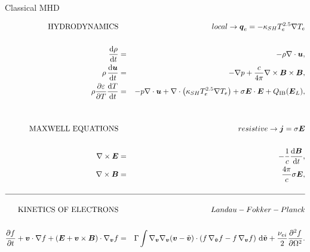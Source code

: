 \documentclass[8pt, compress]{beamer}
\newcommand{\pdv}[2]{\frac{\partial{#1}}{\partial{#2}}}
\newcommand{\vect}[1]{\boldsymbol{#1}}
\newcommand{\dI}{\text{d}}
\newcommand{\nuei}{\nu_{ei}}
\newcommand{\E}{\vect{E}}
\newcommand{\Te}{T_e}
\newcommand{\vv}{\vect{v}}
\newcommand{\vvb}{\tilde{\vect{v}}}
\newcommand{\gv}{\nabla_{\vv}}
\newcommand{\gvb}{\nabla_{\vvb}}
\newcommand{\ft}{f}
\begin{document}
\begin{frame}
\begin{center}
{\huge Classical MHD}  

\begin{eqnarray}
  \text{HYDRODYNAMICS} && 
  local \rightarrow \vect{q}_e = - \kappa_{SH} \Te^{2.5} \nabla \Te \nonumber \\
  && \nonumber \\
  \frac{\dI \rho}{\dI t} &=& - \rho\nabla\cdot\vect{u} , 
  \nonumber\\ 
  \rho\, \frac{\dI \vect{u}}{\dI t} &=& - \nabla p 
  + \frac{c}{4\pi}\nabla\times\vect{B}\times \vect{B}, 
  \nonumber\\   
  \rho \frac{\partial \varepsilon}{\partial T}\frac{\dI T}{\dI t}
  &=& 
  - p \nabla\cdot\vect{u} 
  + \nabla\cdot\left(\kappa_{SH} \Te^{2.5} \nabla \Te \right) 
  + \sigma \E\cdot\E
  + Q_{\text{IB}}(\vect{E}_L) , 
  \nonumber \\
  && \nonumber \\
  && \nonumber \\
  \text{MAXWELL EQUATIONS} && 
  resistive\rightarrow\vect{j} = \sigma \E \nonumber \\
  && \nonumber \\
  \nabla\times\vect{E} &=& -\frac{1}{c}\frac{\dI \vect{B}}{\dI t} ,
  \nonumber \\
  \nabla\times\vect{B} &=& \frac{4\pi}{c}
  \sigma \E ,%
  \nonumber \\
  && \nonumber \\
  \hline \nonumber \\
  \text{KINETICS OF ELECTRONS} && Landau-Fokker-Planck \nonumber \\
  && \nonumber \\
  \pdv{f}{t} + \vect{v}\cdot\nabla f +
  \left( \vect{E} + \vect{v}\times\vect{B}\right)\cdot\nabla_{\vect{v}} f
  &=& 
  \Gamma\int \gv\gv(\vv - \vvb) \cdot \left(
  \ft\, \gvb \ft - \ft\, \gv \ft \right)\, \dI\vvb
  + \frac{\nuei}{2} \frac{\partial^2 f}{\partial \Omega^2} .
  \nonumber
\end{eqnarray}
\end{center}
\end{frame}
\end{document}
